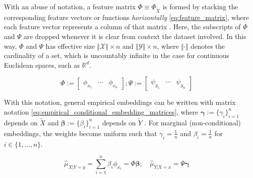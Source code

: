 \documentclass[twoside]{article} \usepackage{aistats2017}
\theoremstyle{definition}
\theoremstyle{theorem}
\newcommand{\rv}[1]{{#1}}
\newcommand{\ds}[1]{\tilde{#1}}
\newcommand{\hatmuYx}{\hat{\mu}_{\rv{Y} | \rv{X} = x}}
\newcommand{\hatmuXy}{\hat{\mu}_{\rv{X} | \rv{Y} = y}}
\newcommand{\cardX}{\Vert \mathcal{X} \Vert}
\newcommand{\cardY}{\Vert \mathcal{Y} \Vert}
\begin{document}
%			
%			
%			
			With an abuse of notation, a feature matrix $\Phi \equiv \Phi_{\ds{X}}$ is formed by stacking the corresponding feature vectors or functions \textit{horizontally} \eqref{eq:feature_matrix}, where each feature vector represents a column of that matrix  \citep{muandet2016kernel}. Here, the subscripts of $\Phi$ and $\Psi$ are dropped whenever it is clear from context the dataset involved. In this way, $\Phi$ and $\Psi$ has effective size $\cardX \times n$ and $\cardY \times n$, where $\Vert \cdot \Vert$ denotes the cardinality of a set, which is uncountably infinite in the case for continuous Euclidean spaces, such as $\mathbb{R}^{d}$.
				
			\begin{equation}
				\Phi := \begin{bmatrix} \phi_{x_{1}} & \cdots & \phi_{x_{n}} \end{bmatrix}; \Psi := \begin{bmatrix} \psi_{y_{1}} & \cdots & \psi_{y_{n}} \end{bmatrix}
			\label{eq:feature_matrix}
			\end{equation}
				

			With this notation, general empirical embeddings can be written with matrix notation \eqref{eq:empirical_conditional_embedding_matrices}, where $\bm{\gamma} := \{\gamma_{i}\}_{i = 1}^{n}$ depends on $\ds{X}$ and $\bm{\beta} := \{\beta_{i}\}_{i = 1}^{n}$ depends on $\ds{Y}$ \citep{muandet2016kernel}. For marginal (non-conditional) embeddings, the weights become uniform such that $\gamma_{i} = \frac{1}{n}$ and $\beta_{i} = \frac{1}{n}$ for $i \in \{1, \dots, n\}$.
			
			\begin{equation}
				\hatmuXy = \sum_{i = 1}^{n} \beta_{i} \phi_{x_{i}} = \Phi \bm{\beta} ;\quad \hatmuYx = \Psi \bm{\gamma}
			\label{eq:empirical_conditional_embedding_matrices}
			\end{equation}
		
\end{document}
